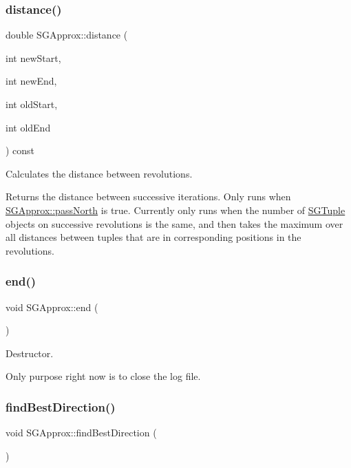 \subsubsection{\texorpdfstring{distance()}{distance()}}
{\footnotesize\ttfamily double S\+G\+Approx\+::distance (\begin{DoxyParamCaption}\item[{int}]{new\+Start,  }\item[{int}]{new\+End,  }\item[{int}]{old\+Start,  }\item[{int}]{old\+End }\end{DoxyParamCaption}) const\hspace{0.3cm}{\ttfamily [private]}}



Calculates the distance between revolutions. 

Returns the distance between successive iterations. Only runs when \hyperlink{classSGApprox_aec0377b26f0efaea314f72554a8862b9}{S\+G\+Approx\+::pass\+North} is true. Currently only runs when the number of \hyperlink{classSGTuple}{S\+G\+Tuple} objects on successive revolutions is the same, and then takes the maximum over all distances between tuples that are in corresponding positions in the revolutions. \mbox{\label{classSGApprox_af4ec568399b6e3ae16e6087d02381c12}} 
\subsubsection{\texorpdfstring{end()}{end()}}
{\footnotesize\ttfamily void S\+G\+Approx\+::end (\begin{DoxyParamCaption}{ }\end{DoxyParamCaption})}



Destructor. 

Only purpose right now is to close the log file. \mbox{\label{classSGApprox_a17d94998661d7d3fdb0618c8ce7dc53b}} 
\subsubsection{\texorpdfstring{find\+Best\+Direction()}{findBestDirection()}}
{\footnotesize\ttfamily void S\+G\+Approx\+::find\+Best\+Direction (\begin{DoxyParamCaption}{ }\end{DoxyParamCaption})\hspace{0.3cm}{\ttfamily [private]}}



